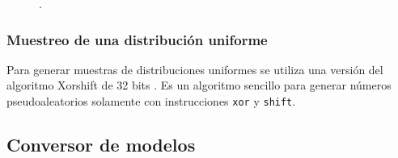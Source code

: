 \begin{figure}[htb]
  \begin{subcaptiongroup}
  \begin{floatrow}
  \end{floatrow}
  \end{subcaptiongroup}
  \caption{\todo.}%
  \label{fig:neuron_comparation}%
\end{figure}


\subsubsection{Muestreo de una distribución uniforme}

Para generar muestras de distribuciones uniformes se utiliza una versión del algoritmo Xorshift de 32 bits \cite{xorshift}. Es un algoritmo sencillo para generar números pseudoaleatorios solamente con instrucciones \texttt{xor} y \texttt{shift}.

\subsection{Conversor de modelos}

